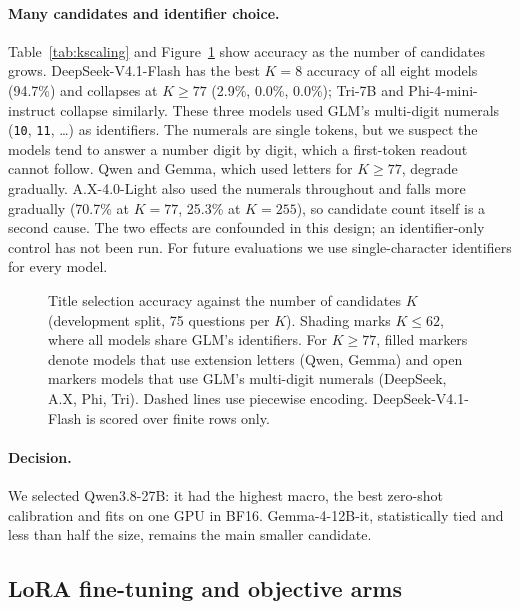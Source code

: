 \paragraph{Many candidates and identifier choice.}
Table~\ref{tab:kscaling} and Figure~\ref{fig:kscaling} show accuracy as the number of
candidates grows. DeepSeek-V4.1-Flash has the best $K=8$ accuracy of all eight models
(94.7\%) and collapses at $K\ge77$ (2.9\%, 0.0\%, 0.0\%); Tri-7B and Phi-4-mini-instruct
collapse similarly. These three models used GLM's multi-digit numerals (\texttt{10},
\texttt{11}, \dots) as identifiers. The numerals are single tokens, but we suspect the models
tend to answer a number digit by digit, which a first-token readout cannot follow. Qwen and
Gemma, which used letters for $K\ge77$, degrade gradually. A.X-4.0-Light also used the
numerals throughout and falls more gradually (70.7\% at $K=77$, 25.3\% at $K=255$), so
candidate count itself is a second cause. The two effects are confounded in this design; an
identifier-only control has not been run. For future evaluations we use single-character
identifiers for every model.

\begin{figure}[t]
\centering
{}
\caption{Title selection accuracy against the number of candidates $K$ (development split,
75 questions per $K$). Shading marks $K\le62$, where all models share GLM's identifiers.
For $K\ge77$, filled markers denote models that use extension letters (Qwen, Gemma) and open
markers models that use GLM's multi-digit numerals (DeepSeek, A.X, Phi, Tri). Dashed lines use
piecewise encoding. DeepSeek-V4.1-Flash is scored over finite rows only.}
\label{fig:kscaling}
\end{figure}

\paragraph{Decision.}
We selected Qwen3.8-27B: it had the highest macro, the best zero-shot calibration and fits
on one GPU in BF16. Gemma-4-12B-it, statistically tied and less than half the size, remains
the main smaller candidate.

\subsection{LoRA fine-tuning and objective arms}
\label{sec:arms}

